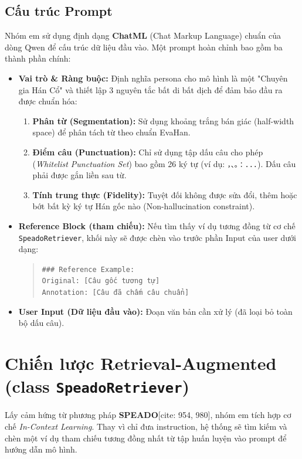 \subsection{Cấu trúc Prompt}

Nhóm em sử dụng định dạng \textbf{ChatML} (Chat Markup Language) chuẩn của dòng Qwen để cấu trúc dữ liệu đầu vào. Một prompt hoàn chỉnh bao gồm ba thành phần chính:

\begin{itemize}
    \item \textbf{Vai trò & Ràng buộc:}
    Định nghĩa persona cho mô hình là một "Chuyên gia Hán Cổ" và thiết lập 3 nguyên tắc bất di bất dịch để đảm bảo đầu ra được chuẩn hóa:
    \begin{enumerate}
        \item \textbf{Phân từ (Segmentation):} Sử dụng khoảng trắng bán giác (half-width space) để phân tách từ theo chuẩn EvaHan.
        \item \textbf{Điểm câu (Punctuation):} Chỉ sử dụng tập dấu câu cho phép (\textit{Whitelist Punctuation Set}) bao gồm 26 ký tự (ví dụ: \texttt{，、。：...}). Dấu câu phải được gắn liền sau từ.
        \item \textbf{Tính trung thực (Fidelity):} Tuyệt đối không được sửa đổi, thêm hoặc bớt bất kỳ ký tự Hán gốc nào (Non-hallucination constraint).
    \end{enumerate}
    
    \item \textbf{Reference Block (tham chiếu):}
    Nếu tìm thấy ví dụ tương đồng từ cơ chế \texttt{SpeadoRetriever}, khối này sẽ được chèn vào trước phần Input của user dưới dạng:
    \begin{quote}
        \texttt{\#\#\# Reference Example:}\\
        \texttt{Original: [Câu gốc tương tự]}\\
        \texttt{Annotation: [Câu đã chấm câu chuẩn]}
    \end{quote}
    
    \item \textbf{User Input (Dữ liệu đầu vào):}
    Đoạn văn bản cần xử lý (đã loại bỏ toàn bộ dấu câu).
\end{itemize}

\section{Chiến lược Retrieval-Augmented (class \texttt{SpeadoRetriever})}
Lấy cảm hứng từ phương pháp \textbf{SPEADO}[cite: 954, 980], nhóm em tích hợp cơ chế \textit{In-Context Learning}. Thay vì chỉ đưa instruction, hệ thống sẽ tìm kiếm và chèn một ví dụ tham chiếu tương đồng nhất từ tập huấn luyện vào prompt để hướng dẫn mô hình.

